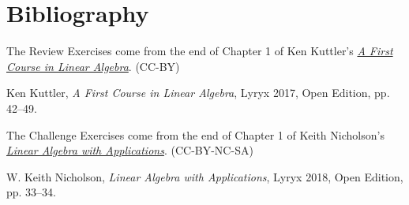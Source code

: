 \documentclass{ximera}
\begin{document}
\section*{Bibliography}
The Review Exercises come from the end of Chapter 1 of Ken Kuttler's \href{https://open.umn.edu/opentextbooks/textbooks/a-first-course-in-linear-algebra-2017}{\it A First Course in Linear Algebra}. (CC-BY)

Ken Kuttler, {\it  A First Course in Linear Algebra}, Lyryx 2017, Open Edition, pp. 42--49. 

The Challenge Exercises come from the end of Chapter 1 of Keith Nicholson's \href{https://open.umn.edu/opentextbooks/textbooks/linear-algebra-with-applications}{\it Linear Algebra with Applications}. (CC-BY-NC-SA)

W. Keith Nicholson, {\it Linear Algebra with Applications}, Lyryx 2018, Open Edition, pp. 33--34. 
\end{document}
